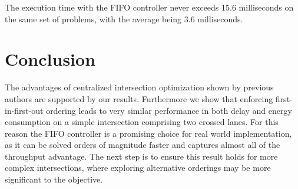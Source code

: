 The execution time with the FIFO controller never exceeds 15.6 milliseconds on the same set of problems, with the average being 3.6 milliseconds. 

\section{Conclusion}
The advantages of centralized intersection optimization shown by previous authors are supported by our results.  Furthermore we show that enforcing first-in-first-out ordering leads to very similar performance in both delay and energy consumption on a simple intersection comprising two crossed lanes. For this reason the FIFO controller is a promising choice for real world implementation, as it can be solved orders of magnitude faster and captures almost all of the throughput advantage. The next step is to ensure this result holds for more complex intersections, where exploring alternative orderings may be more significant to the objective.      


%
%






